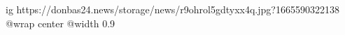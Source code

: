 
 
 
 
 

\ifcmt
  ig https://donbas24.news/storage/news/r9ohrol5gdtyxx4q.jpg?1665590322138
  @wrap center
  @width 0.9
\fi
